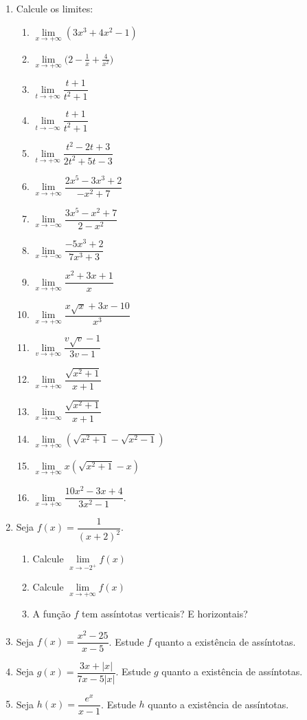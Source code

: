 \begin{enumerate}
\item Calcule os limites: 
    \begin{multicols}{3}
    \begin{enumerate} 
    \item     $\lim\limits_{x\to+\infty} (3x^3 + 4x^2 - 1)$
    \item $\lim\limits_{x\to+\infty} \bigg(2 - \frac{1}{ x} + \frac{4}{ x^2} \bigg)$ 
    \item     $\lim\limits_{t\to+\infty} \dfrac{t + 1} {t^2 +1}$ 
    \item $\lim\limits_{t\to-\infty} \dfrac{t +1}{ t^2 + 1}$ 
    \item  $\lim\limits_{t\to+\infty}\dfrac{ t^2-2t + 3}{    2t^2 + 5t- 3}$ 
    \item $\lim\limits_{x\to+\infty}\dfrac{2x^5 - 3x^3 + 2}{ -x^2 + 7}$ 
    \item     $\lim\limits_{x\to-\infty} \dfrac{3x^5 - x^2 + 7}{ 2 - x^2} $ 
    \item     $\lim\limits_{x\to-\infty}\dfrac{-5x^3 + 2}{7x^3 + 3} $ 
    \item $\lim\limits_{x\to+\infty} \dfrac{ x^2 + 3x + 1}{ x}$ 
    \item   $\lim\limits_{x\to+\infty}\dfrac{x \sqrt{x} + 3x -10}{x^3} $ 
    \item     $\lim\limits_{v\to+\infty} \dfrac{v\sqrt{v}- 1}{3v - 1} $ 
    \item     $\lim\limits_{x\to+\infty}\dfrac{\displaystyle\sqrt{x^2+ 1}}{ x + 1} $ 
    \item $\lim\limits_{x\to-\infty}\dfrac{\displaystyle\sqrt{x^2 + 1}}{ x + 1}$ 
    \item   $\lim\limits_{x\to+\infty} \left(\displaystyle\sqrt{x^2 + 1} -\displaystyle\sqrt{x^2 - 1}\right)$
    \item  $\lim\limits_{x\to+\infty} x\left(\displaystyle\sqrt{x^2 + 1}- x\right)$ 
    \item $\lim\limits_{x\to+\infty} \dfrac{10x^2 -3x + 4}{ 3x^2 -1}.$
    \end{enumerate}
    \end{multicols}


\item Seja $f(x) = \dfrac{1}{ (x + 2)^2}.$ 
    \begin{enumerate}
    \item Calcule  $\lim\limits_{x\to -2^+} f(x)$ 
    \item Calcule $\lim\limits_{x\to +\infty} f(x)$
    \item  A função $f$ tem assíntotas verticais? E horizontais?
    \end{enumerate}

\item Seja $f(x) = \dfrac{x^2 - 25}{ x - 5}$. Estude $f$ quanto a existência de assíntotas. 
\item Seja $g(x) = \dfrac{3x + |x|}{ 7x - 5|x| }$. Estude $g$ quanto a existência de assíntotas.

\item Seja $h(x) = \dfrac{e^x}{ x - 1}$. Estude $h$ quanto a existência de assíntotas.


\end{enumerate}